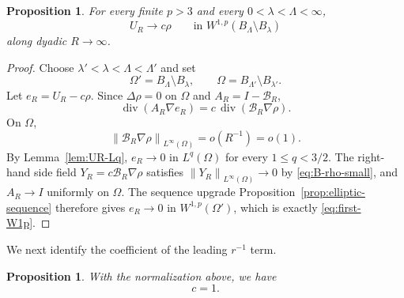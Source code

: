 \documentclass[11pt]{amsart}
\numberwithin{equation}{section}
\newtheorem{proposition}[theorem]{Proposition}
\theoremstyle{definition}
\newcommand{\divE}{\operatorname{div}}
\newcommand{\rhoE}{\rho}
\newcommand{\norm}[1]{\left\lVert #1\right\rVert}
\begin{document}
\begin{proposition}\label{prop:first-W1p}
For every finite $p>3$ and every $0<\lambda<\Lambda<\infty$,
\begin{equation}\label{eq:first-W1p}
        U_R\to c\rhoE
        \qquad\text{in }W^{1,p}(B_\Lambda\setminus B_\lambda)
\end{equation}
along dyadic $R\to\infty$.
\end{proposition}

\begin{proof}
Choose $\lambda'<\lambda<\Lambda<\Lambda'$ and set
$$
        \Omega'=B_\Lambda\setminus B_\lambda,
        \qquad \Omega=B_{\Lambda'}\setminus B_{\lambda'}.
$$
Let $e_R=U_R-c\rhoE$.  Since $\Delta\rhoE=0$ on $\Omega$ and $A_R=I-\mathcal B_R$,
$$
        \divE(A_R\nabla e_R)=c\,\divE(\mathcal B_R\nabla\rhoE).
$$
On $\Omega$,
\begin{equation}\label{eq:B-rho-small}
        \norm{\mathcal B_R\nabla\rhoE}_{L^\infty(\Omega)}=o(R^{-1})=o(1).
\end{equation}
By Lemma~\ref{lem:UR-Lq}, $e_R\to0$ in $L^q(\Omega)$ for every $1\le q<3/2$.  The right-hand side field $Y_R=c\mathcal B_R\nabla\rhoE$ satisfies $\norm{Y_R}_{L^\infty(\Omega)}\to0$ by \eqref{eq:B-rho-small}, and $A_R\to I$ uniformly on $\Omega$.  The sequence upgrade Proposition~\ref{prop:elliptic-sequence} therefore gives $e_R\to0$ in $W^{1,p}(\Omega')$, which is exactly \eqref{eq:first-W1p}.
\end{proof}

We next identify the coefficient of the leading \(r^{-1}\) term.
\begin{proposition}\label{prop:c=1}
With the normalization above, we have
\begin{equation}\label{eq:c-equals-one}
        c=1.
\end{equation}
\end{proposition}
\end{document}
